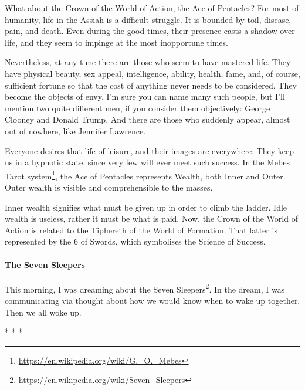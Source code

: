 What about the Crown of the World of Action, the Ace of Pentacles? For most of humanity, life in the Assiah is a difficult struggle. It is bounded by toil, disease, pain, and death. Even during the good times, their presence casts a shadow over life, and they seem to impinge at the most inopportune times.

Nevertheless, at any time there are those who seem to have mastered life. They have physical beauty, sex appeal, intelligence, ability, health, fame, and, of course, sufficient fortune so that the cost of anything never needs to be considered. They become the objects of envy. I'm sure you can name many such people, but I'll mention two quite different men, if you consider them objectively: George Clooney and Donald Trump. And there are those who suddenly appear, almost out of nowhere, like Jennifer Lawrence.

Everyone desires that life of leisure, and their images are everywhere. They keep us in a hypnotic state, since very few will ever meet such success. In the Mebes Tarot system\footnote{\url{https://en.wikipedia.org/wiki/G._O._Mebes}}, the Ace of Pentacles represents Wealth, both Inner and Outer. Outer wealth is visible and comprehensible to the masses.

Inner wealth signifies what must be given up in order to climb the ladder. Idle wealth is useless, rather it must be what is paid. Now, the Crown of the World of Action is related to the Tiphereth of the World of Formation. That latter is represented by the 6 of Swords, which symbolises the Science of Success.

\paragraph{The Seven Sleepers}


This morning, I was dreaming about the Seven Sleepers\footnote{\url{https://en.wikipedia.org/wiki/Seven_Sleepers}}. In the dream, I was communicating via thought about how we would know when to wake up together. Then we all woke up.



\begin{center}* * *\end{center}

